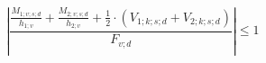 \documentclass[12pt]{article}
\begin{document}
\begin{displaymath}
\left| \frac {\frac {M_{1;v;s;d}} {h_{1;v}} + \frac {M_{2;v;s;d}} {h_{2;v}} + \frac {1} {2} \cdot \left( V_{1;k;s;d} + V_{2;k;s;d} \right)} {F_{v;d}} \right| \leq 1
\end{displaymath}
\end{document}
